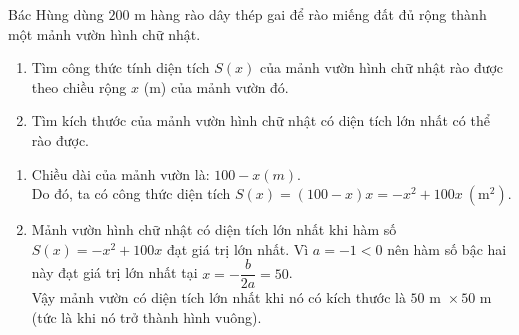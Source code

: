 \begin{bt}%
	Bác Hùng dùng $200$ m hàng rào dây thép gai để rào miếng đất đủ rộng thành một mảnh vườn hình chữ nhật.
	\begin{enumerate}
		\item Tìm công thức tính diện tích $S(x)$ của mảnh vườn hình chữ nhật rào được theo chiều rộng $x$ (m) của mảnh vườn đó.
		\item Tìm kích thước của mảnh vườn hình chữ nhật có diện tích lớn nhất có thể rào được.
	\end{enumerate}
	\loigiai
	{
		\begin{enumerate}
			\item Chiều dài của mảnh vườn là: $100-x(m)$.\\
			Do đó, ta có công thức diện tích $S(x)=(100-x) x=-x^2+100 x~\left(\text{m}^2\right)$.
			\item Mảnh vườn hình chữ nhật có diện tích lớn nhất khi hàm số $S(x)=-x^2+100 x$ đạt giá trị lớn nhất. Vì $a=-1<0$ nên hàm số bậc hai này đạt giá trị lớn nhất tại $x=-\dfrac{b}{2 a}=50$.\\
			Vậy mảnh vườn có diện tích lớn nhất khi nó có kích thước là $50 \text{ m } \times 50 \text{ m}$ (tức là khi nó trở thành hình vuông).
		\end{enumerate}
	}
\end{bt}

\begin{ex}%
\end{ex}

